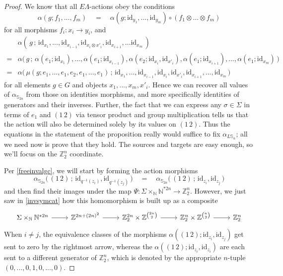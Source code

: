 \documentclass{amsbook} %
\numberwithin{section}{chapter}
\begin{document}
\begin{proof}
We know that all $E\Lambda$-actions obey the conditions
\[ \alpha(g; f_1, ..., f_m) \quad = \quad \alpha(g; \mathrm{id}_{y_1}, ..., \mathrm{id}_{y_m}) \circ (f_1 \otimes ... \otimes f_m) \]
for all morphisms $f_i: x_i \to y_i$, and
\[ \begin{array}{rl}
			& \alpha( \, g \, ; \, \mathrm{id}_{x_1}, ..., \mathrm{id}_{x_{i-1}}, \mathrm{id}_{x_i \otimes x'_{i}}, \mathrm{id}_{x_{i+1}}, ... \mathrm{id}_{x_m} \, ) \\
			= & \alpha\big( \, g \, ; \, \alpha(e_1;\mathrm{id}_{x_1}), ..., \alpha(e_1;\mathrm{id}_{x_{i-1}}), \alpha(e_2;\mathrm{id}_{x_i}, \mathrm{id}_{x'_i}), \alpha(e_1;\mathrm{id}_{x_{i+1}}), ...,  \alpha(e_1;\mathrm{id}_{x_m}) \, \big) \\
			= & \alpha\big( \, \mu(g; e_1, ..., e_1, e_2, e_1, ..., e_1) \, ; \, \mathrm{id}_{x_1}, ..., \mathrm{id}_{x_{i-1}}, \mathrm{id}_{x_i}, \mathrm{id}_{x'_{i}}, \mathrm{id}_{x_{i+1}}, ..., \mathrm{id}_{x_m} \, \big)
		\end{array}
\]
for all elements $g \in G$ and objects $x_1, ..., x_m, x'_i$. Hence we can recover all values of $\alpha_{\mathbb{S}_{2n}}$ from those on identities morphisms, and more specifically identities of generators and their inverses. Further, the fact that we can express any $\sigma \in \Sigma$ in terms of $e_1$ and $(1 \, 2)$ via tensor product and group multiplication tells us that the action will also be determined solely by its values on $(1 \, 2)$. Thus the equations in the statement of the proposition really would suffice to fix $\alpha_{L\mathbb{S}_n}$; all we need now is prove that they hold. The sources and targets are easy enough, so we'll focus on the $\mathbb{Z}_2^{n}$ coordinate.

Per \cref{freeinvalgc}, we will start by forming the action morphisms
\[ \alpha_{\mathbb{S}_{2n}}\big( \, (1 \, 2) \, ; \, \mathrm{id}_{q^{-1}(z_i)}, \mathrm{id}_{q^{-1}(z_j)} \, \big) \quad = \quad \alpha_{\mathbb{S}_{2n}}\big( \, (1 \, 2) \, ; \, \mathrm{id}_{z_i}, \mathrm{id}_{z_j} \, \big) \]
and then find their images under the map $\Psi: \Sigma \times_{\mathbb{N}} \mathbb{N}^{\ast 2n} \to \mathbb{Z}_2^{n}$. However, we just saw in \cref{invsymcat} how this homomorphism is built up as a composite
\[ \begin{tikzcd}
 \Sigma \times_{\mathbb{N}} \mathbb{N}^{\ast 2n} \ar[r] & \mathbb{Z}^{2n + (2n)^2} \ar[r] & \mathbb{Z}_2^{2n} \times \mathbb{Z}^{{2n}\choose{2}} \ar[r] & \mathbb{Z}_2^{n} \times \mathbb{Z}^{{n}\choose{2}}  \ar[r] & \mathbb{Z}_2^{n}
\end{tikzcd} \]
When $i \neq j$, the equivalence classes of the morphisms $\alpha((1 \, 2);\mathrm{id}_{z_i}, \mathrm{id}_{z_j})$ get sent to zero by the rightmost arrow, whereas the $\alpha((1 \, 2);\mathrm{id}_{z_i}, \mathrm{id}_{z_i})$ are each sent to a different generator of $\mathbb{Z}_2^{n}$, which is denoted by the appropriate $n$-tuple $(0,...,0, 1, 0,...,0)$. 


\end{proof}
\end{document}
